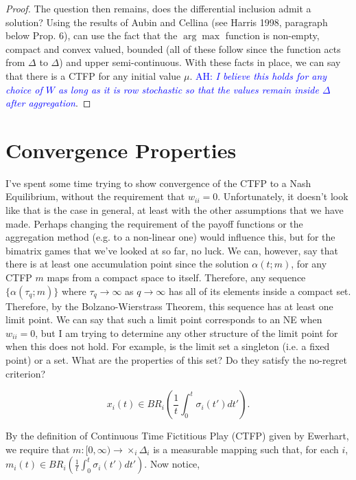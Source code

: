 \documentclass{article}
\theoremstyle{definition}
\newcommand{\ah}[1]{\textcolor{blue}{AH: \textit{#1}}}
\begin{document}
\begin{proof}
		The question then remains, does the differential inclusion admit a solution? Using the
		results of Aubin and Cellina (see Harris 1998, paragraph below Prop. 6), can use the fact
		that the $\arg \max$ function is non-empty, compact and convex valued, bounded (all of
		these follow since the function acts from $\Delta$ to $\Delta$) and upper semi-continuous.
		With these facts in place, we can say that there is a CTFP for any initial value $\mu$.
		\ah{I believe this holds for any choice of $W$ as long as it is row stochastic so that
		the values remain inside $\Delta$ after aggregation}.
	\end{proof}
	
	\newpage
	
	\section*{Convergence Properties}

	I've spent some time trying to show convergence of the CTFP to a Nash Equilibrium, without the
	requirement that $w_{ii} = 0$. Unfortunately, it doesn't look like that is the case in general,
	at least with the other assumptions that we have made. Perhaps changing the requirement of the
	payoff functions or the aggregation method (e.g. to a non-linear one) would influence this, but
	for the bimatrix games that we've looked at so far, no luck.
	We can, however, say that there is at least one accumulation point since the solution $\alpha(t;
	m)$, for any CTFP
	$m$ maps from a compact space to itself. Therefore, any sequence $\{\alpha(\tau_q; m)\}$ where
	$\tau_q \rightarrow \infty$ as $q \rightarrow \infty$ has all of its elements inside a compact
	set. Therefore, by the Bolzano-Wierstrass Theorem, this sequence has at least one limit point.
	We can say that such a limit point corresponds to an NE when $w_{ii} = 0$, but I am trying to
	determine any other structure of the limit point for when this does not hold. For example, is
	the limit set a singleton (i.e. a fixed point) or a set. What are the properties of this set?
	Do they satisfy the no-regret criterion?	\newpage

	\begin{equation}
		x_i(t) \in BR_i \left( \frac{1}{t} \int_{0}^{t} \sigma_i(t') dt' \right).
	\end{equation}
	
	By the definition of Continuous Time Fictitious Play (CTFP) given by Ewerhart, we require that $m: [0, \infty) \rightarrow \times_i \Delta_i$ is a measurable mapping such that, for each $i$, $m_i(t) \in BR_i \left( \frac{1}{t} \int_{0}^{t} \sigma_i(t') dt' \right)$. Now notice,
	
\end{document}
